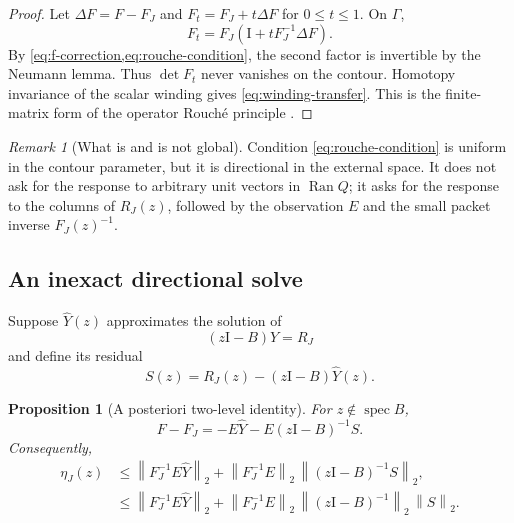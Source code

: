 \documentclass[11pt]{article}
\newtheorem{proposition}[theorem]{Proposition}
\theoremstyle{definition}
\theoremstyle{remark}
\newtheorem{remark}[theorem]{Remark}
\newcommand{\Id}{\mathrm I}
\newcommand{\Ran}{\operatorname{Ran}}
\newcommand{\spec}{\operatorname{spec}}
\newcommand{\norm}[1]{\left\lVert#1\right\rVert}
\begin{document}
\begin{proof}
Let \(\Delta F=F-F_J\) and
\(F_t=F_J+t\Delta F\) for \(0\leq t\leq1\).  On \(\Gamma\),
\[
 F_t=F_J\left(\Id+tF_J^{-1}\Delta F\right).
\]
By \cref{eq:f-correction,eq:rouche-condition}, the second factor is
invertible by the Neumann lemma.  Thus \(\det F_t\) never vanishes on the
contour.  Homotopy invariance of the scalar winding gives
\cref{eq:winding-transfer}.  This is the finite-matrix form of the operator
Rouch\'e principle \citep{GohbergSigal1971}.
\end{proof}

\begin{remark}[What is and is not global]
\label{rem:not-global}
Condition \cref{eq:rouche-condition} is uniform in the contour parameter,
but it is directional in the external space.  It does not ask for the
response to arbitrary unit vectors in \(\Ran Q\); it asks for the response
to the columns of \(R_J(z)\), followed by the observation \(E\) and the
small packet inverse \(F_J(z)^{-1}\).
\end{remark}

\subsection{An inexact directional solve}

Suppose \(\widehat Y(z)\) approximates the solution of
\begin{equation}
 (z\Id-B)Y=R_J
 \label{eq:residual-system}
\end{equation}
and define its residual
\begin{equation}
 S(z)=R_J(z)-(z\Id-B)\widehat Y(z).
 \label{eq:second-residual}
\end{equation}

\begin{proposition}[A posteriori two-level identity]
\label{prop:two-level}
For \(z\notin\spec B\),
\begin{equation}
 F-F_J=-E\widehat Y-E(z\Id-B)^{-1}S.
 \label{eq:two-level}
\end{equation}
Consequently,
\begin{align}
 \eta_J(z)
 &\leq \norm{F_J^{-1}E\widehat Y}_2
 +\norm{F_J^{-1}E}_2\,
   \norm{(z\Id-B)^{-1}S}_2,
 \label{eq:directional-aposteriori}\\
 &\leq \norm{F_J^{-1}E\widehat Y}_2
 +\norm{F_J^{-1}E}_2\,
   \norm{(z\Id-B)^{-1}}_2\,\norm{S}_2.
 \label{eq:global-remainder}
\end{align}
\end{proposition}
\end{document}
